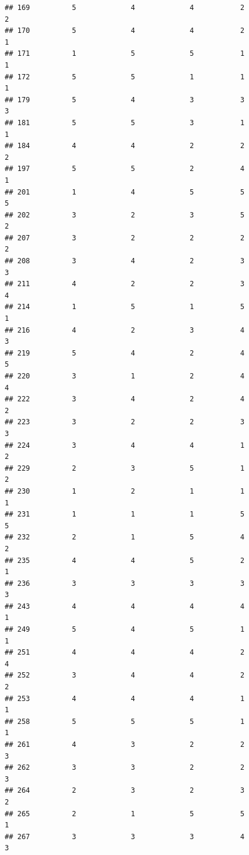 \documentclass[
]{article}
\begin{document}
\begin{verbatim}
## 169          5             4             4           2             2
## 170          5             4             4           2             1
## 171          1             5             5           1             1
## 172          5             5             1           1             1
## 179          5             4             3           3             3
## 181          5             5             3           1             1
## 184          4             4             2           2             2
## 197          5             5             2           4             1
## 201          1             4             5           5             5
## 202          3             2             3           5             2
## 207          3             2             2           2             2
## 208          3             4             2           3             3
## 211          4             2             2           3             4
## 214          1             5             1           5             1
## 216          4             2             3           4             3
## 219          5             4             2           4             5
## 220          3             1             2           4             4
## 222          3             4             2           4             2
## 223          3             2             2           3             3
## 224          3             4             4           1             2
## 229          2             3             5           1             2
## 230          1             2             1           1             1
## 231          1             1             1           5             5
## 232          2             1             5           4             2
## 235          4             4             5           2             1
## 236          3             3             3           3             3
## 243          4             4             4           4             1
## 249          5             4             5           1             1
## 251          4             4             4           2             4
## 252          3             4             4           2             2
## 253          4             4             4           1             1
## 258          5             5             5           1             1
## 261          4             3             2           2             3
## 262          3             3             2           2             3
## 264          2             3             2           3             2
## 265          2             1             5           5             1
## 267          3             3             3           4             3

\end{verbatim}
\end{document}
